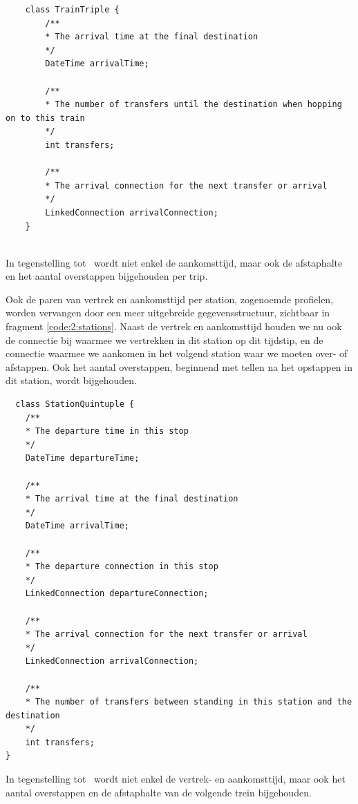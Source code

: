 \begin{code}[h]
	\begin{verbatim}
	class TrainTriple {
		/**
		* The arrival time at the final destination
		*/
		DateTime arrivalTime;
		
		/**
		* The number of transfers until the destination when hopping on to this train
		*/
		int transfers;
		
		/**
		* The arrival connection for the next transfer or arrival
		*/
		LinkedConnection arrivalConnection;
	}
	
	\end{verbatim}
	\caption[CSA: Gegevensstructuur voor trips]{In tegenstelling tot~\cite{strasser17} wordt niet enkel de aankomsttijd, maar ook de afstaphalte en het aantal overstappen bijgehouden per trip.}
	\label{code:2:trips}
\end{code}

Ook de paren van vertrek en aankomsttijd per station, zogenoemde profielen, worden vervangen door een meer uitgebreide gegevensstructuur, zichtbaar in fragment \ref{code:2:stations}. Naast de vertrek en aankomsttijd houden we nu ook de connectie bij waarmee we vertrekken in dit station op dit tijdstip, en de connectie waarmee we aankomen in het volgend station waar we moeten over- of afstappen. Ook het aantal overstappen, beginnend met tellen na het opstappen in dit station, wordt bijgehouden.

\begin{code}[h]
\begin{verbatim}
  class StationQuintuple {
	/**
	* The departure time in this stop
	*/
	DateTime departureTime;
	
	/**
	* The arrival time at the final destination
	*/
	DateTime arrivalTime;
	
	/**
	* The departure connection in this stop
	*/
	LinkedConnection departureConnection;
	
	/**
	* The arrival connection for the next transfer or arrival
	*/
	LinkedConnection arrivalConnection;
	
	/**
	* The number of transfers between standing in this station and the destination
	*/
	int transfers;
}
	\end{verbatim}
		\caption[CSA: Gegevensstructuur voor stopprofielen]{In tegenstelling tot~\cite{strasser17} wordt niet enkel de vertrek- en aankomsttijd, maar ook het aantal overstappen en de afstaphalte van de volgende trein bijgehouden.}
	\label{code:2:stations}
\end{code}

